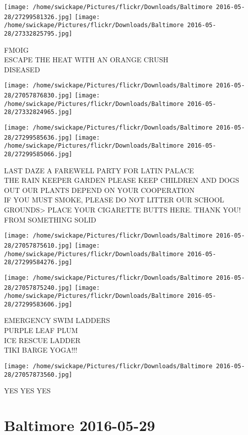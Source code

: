 \documentclass[10pt,letterpaper]{article}
\begin{document}
\vspace{0.25in}
\texttt{[image: /home/swickape/Pictures/flickr/Downloads/Baltimore 2016-05-28/27299581326.jpg]}
\texttt{[image: /home/swickape/Pictures/flickr/Downloads/Baltimore 2016-05-28/27332825795.jpg]}

FMOIG\\
ESCAPE THE HEAT WITH AN ORANGE CRUSH\\
DISEASED
\pagebreak

\texttt{[image: /home/swickape/Pictures/flickr/Downloads/Baltimore 2016-05-28/27057876830.jpg]}
\texttt{[image: /home/swickape/Pictures/flickr/Downloads/Baltimore 2016-05-28/27332824965.jpg]}

\texttt{[image: /home/swickape/Pictures/flickr/Downloads/Baltimore 2016-05-28/27299585636.jpg]}
\texttt{[image: /home/swickape/Pictures/flickr/Downloads/Baltimore 2016-05-28/27299585066.jpg]}

LAST DAZE A FAREWELL PARTY FOR LATIN PALACE\\
THE RAIN KEEPER GARDEN PLEASE KEEP CHILDREN AND DOGS OUT OUR PLANTS DEPEND ON YOUR COOPERATION\\
IF YOU MUST SMOKE, PLEASE DO NOT LITTER OUR SCHOOL GROUNDS>  PLACE YOUR CIGARETTE BUTTS HERE.  THANK YOU!\\
FROM SOMETHING SOLID
\pagebreak

\texttt{[image: /home/swickape/Pictures/flickr/Downloads/Baltimore 2016-05-28/27057875610.jpg]}
\texttt{[image: /home/swickape/Pictures/flickr/Downloads/Baltimore 2016-05-28/27299584276.jpg]}

\texttt{[image: /home/swickape/Pictures/flickr/Downloads/Baltimore 2016-05-28/27057875240.jpg]}
\texttt{[image: /home/swickape/Pictures/flickr/Downloads/Baltimore 2016-05-28/27299583606.jpg]}

EMERGENCY SWIM LADDERS\\
PURPLE LEAF PLUM\\
ICE RESCUE LADDER\\
TIKI BARGE YOGA!!!
\pagebreak

\texttt{[image: /home/swickape/Pictures/flickr/Downloads/Baltimore 2016-05-28/27057873560.jpg]}

YES YES YES
\pagebreak

\section*{Baltimore 2016-05-29}
\end{document}
